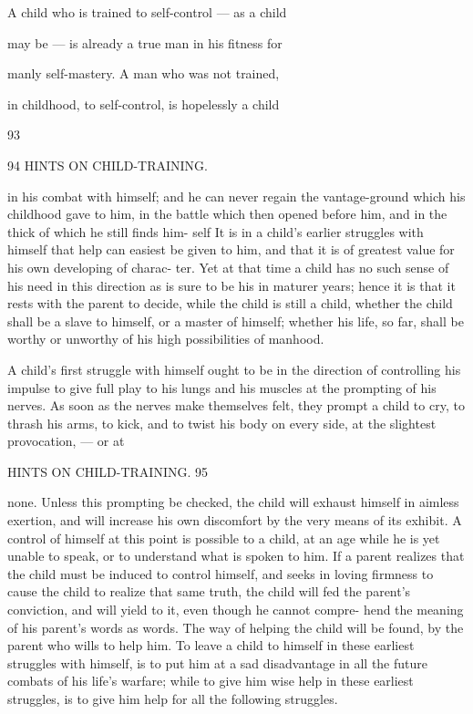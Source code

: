\documentclass[
]{book}
\begin{document}
A child who is trained to self-control --- as a child

may be --- is already a true man in his fitness for

manly self-mastery. A man who was not trained,

in childhood, to self-control, is hopelessly a child

93

94 HINTS ON CHILD-TRAINING.

in his combat with himself; and he can never regain the vantage-ground which his childhood gave to him, in the battle which then opened before him, and in the thick of which he still finds him- self It is in a child's earlier struggles with himself that help can easiest be given to him, and that it is of greatest value for his own developing of charac- ter. Yet at that time a child has no such sense of his need in this direction as is sure to be his in maturer years; hence it is that it rests with the parent to decide, while the child is still a child, whether the child shall be a slave to himself, or a master of himself; whether his life, so far, shall be worthy or unworthy of his high possibilities of manhood.

A child's first struggle with himself ought to be in the direction of controlling his impulse to give full play to his lungs and his muscles at the prompting of his nerves. As soon as the nerves make themselves felt, they prompt a child to cry, to thrash his arms, to kick, and to twist his body on every side, at the slightest provocation, --- or at

HINTS ON CHILD-TRAINING. 95

none. Unless this prompting be checked, the child will exhaust himself in aimless exertion, and will increase his own discomfort by the very means of its exhibit. A control of himself at this point is possible to a child, at an age while he is yet unable to speak, or to understand what is spoken to him. If a parent realizes that the child must be induced to control himself, and seeks in loving firmness to cause the child to realize that same truth, the child will fed the parent's conviction, and will yield to it, even though he cannot compre- hend the meaning of his parent's words as words. The way of helping the child will be found, by the parent who wills to help him. To leave a child to himself in these earliest struggles with himself, is to put him at a sad disadvantage in all the future combats of his life's warfare; while to give him wise help in these earliest struggles, is to give him help for all the following struggles.
\end{document}
